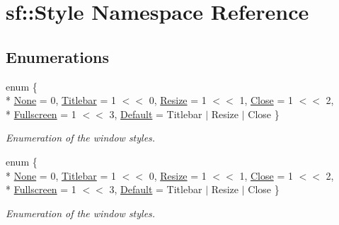 \hypertarget{namespacesf_1_1_style}{\section{sf\-:\-:Style Namespace Reference}
\label{namespacesf_1_1_style}
}
\subsection*{Enumerations}
\begin{DoxyCompactItemize}
\item 
enum \{ \\*
\hyperlink{group__window_gga363853f6419f9ca64dcd85eae2e5caa9ac2b155f5f7b49b49c7fb99655f8da86e}{None} = 0, 
\hyperlink{group__window_gga363853f6419f9ca64dcd85eae2e5caa9abf046c6fcae63075c651812c6774e389}{Titlebar} = 1 $<$$<$ 0, 
\hyperlink{group__window_gga363853f6419f9ca64dcd85eae2e5caa9aa7c6f765bd5c0cdd9f81b47871508f3e}{Resize} = 1 $<$$<$ 1, 
\hyperlink{group__window_gga363853f6419f9ca64dcd85eae2e5caa9a76bbd82b28e359cc0feec9e5ec123b40}{Close} = 1 $<$$<$ 2, 
\\*
\hyperlink{group__window_gga363853f6419f9ca64dcd85eae2e5caa9ac0b0bcb071d1ae40aefb7a1a7464f079}{Fullscreen} = 1 $<$$<$ 3, 
\hyperlink{group__window_gga363853f6419f9ca64dcd85eae2e5caa9aaf73ca9c9fa787f9da9c1d7527d42734}{Default} = Titlebar $\vert$ Resize $\vert$ Close
 \}
\begin{DoxyCompactList}\small\item\em Enumeration of the window styles. \end{DoxyCompactList}\item 
enum \{ \\*
\hyperlink{group__window_gga363853f6419f9ca64dcd85eae2e5caa9ac2b155f5f7b49b49c7fb99655f8da86e}{None} = 0, 
\hyperlink{group__window_gga363853f6419f9ca64dcd85eae2e5caa9abf046c6fcae63075c651812c6774e389}{Titlebar} = 1 $<$$<$ 0, 
\hyperlink{group__window_gga363853f6419f9ca64dcd85eae2e5caa9aa7c6f765bd5c0cdd9f81b47871508f3e}{Resize} = 1 $<$$<$ 1, 
\hyperlink{group__window_gga363853f6419f9ca64dcd85eae2e5caa9a76bbd82b28e359cc0feec9e5ec123b40}{Close} = 1 $<$$<$ 2, 
\\*
\hyperlink{group__window_gga363853f6419f9ca64dcd85eae2e5caa9ac0b0bcb071d1ae40aefb7a1a7464f079}{Fullscreen} = 1 $<$$<$ 3, 
\hyperlink{group__window_gga363853f6419f9ca64dcd85eae2e5caa9aaf73ca9c9fa787f9da9c1d7527d42734}{Default} = Titlebar $\vert$ Resize $\vert$ Close
 \}
\begin{DoxyCompactList}\small\item\em Enumeration of the window styles. \end{DoxyCompactList}\end{DoxyCompactItemize}
